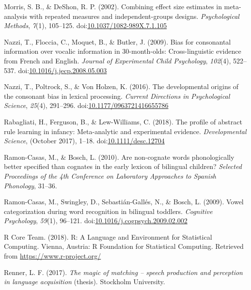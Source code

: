 \documentclass[
  man, noextraspace]{apa6}
\begin{document}
\leavevmode\hypertarget{ref-morris2002combining}{}%
Morris, S. B., \& DeShon, R. P. (2002). Combining effect size estimates in meta-analysis with repeated measures and independent-groups designs. \emph{Psychological Methods}, \emph{7}(1), 105--125. doi:\href{https://doi.org/10.1037/1082-989X.7.1.105}{10.1037/1082-989X.7.1.105}

\leavevmode\hypertarget{ref-Nazzi2009a}{}%
Nazzi, T., Floccia, C., Moquet, B., \& Butler, J. (2009). Bias for consonantal information over vocalic information in 30-month-olds: Cross-linguistic evidence from French and English. \emph{Journal of Experimental Child Psychology}, \emph{102}(4), 522--537. doi:\href{https://doi.org/10.1016/j.jecp.2008.05.003}{10.1016/j.jecp.2008.05.003}

\leavevmode\hypertarget{ref-Nazzi2016}{}%
Nazzi, T., Poltrock, S., \& Von Holzen, K. (2016). The developmental origins of the consonant bias in lexical processing. \emph{Current Directions in Psychological Science}, \emph{25}(4), 291--296. doi:\href{https://doi.org/10.1177/0963721416655786}{10.1177/0963721416655786}

\leavevmode\hypertarget{ref-Rabagliati2018}{}%
Rabagliati, H., Ferguson, B., \& Lew-Williams, C. (2018). The profile of abstract rule learning in infancy: Meta-analytic and experimental evidence. \emph{Developmental Science}, (October 2017), 1--18. doi:\href{https://doi.org/10.1111/desc.12704}{10.1111/desc.12704}

\leavevmode\hypertarget{ref-Ramon-Casas2010}{}%
Ramon-Casas, M., \& Bosch, L. (2010). Are non-cognate words phonologically better specified than cognates in the early lexicon of bilingual children? \emph{Selected Proceedings of the 4th Conference on Laboratory Approaches to Spanish Phonology}, 31--36.

\leavevmode\hypertarget{ref-Ramon-Casas2009}{}%
Ramon-Casas, M., Swingley, D., Sebastián-Gallés, N., \& Bosch, L. (2009). Vowel categorization during word recognition in bilingual toddlers. \emph{Cognitive Psychology}, \emph{59}(1), 96--121. doi:\href{https://doi.org/10.1016/j.cogpsych.2009.02.002}{10.1016/j.cogpsych.2009.02.002}

\leavevmode\hypertarget{ref-R}{}%
R Core Team. (2018). R: A Language and Environment for Statistical Computing. Vienna, Austria: R Foundation for Statistical Computing. Retrieved from \url{https://www.r-project.org/}

\leavevmode\hypertarget{ref-Renner2017}{}%
Renner, L. F. (2017). \emph{The magic of matching -- speech production and perception in language acquisition} (thesis). Stockholm University.
\end{document}
